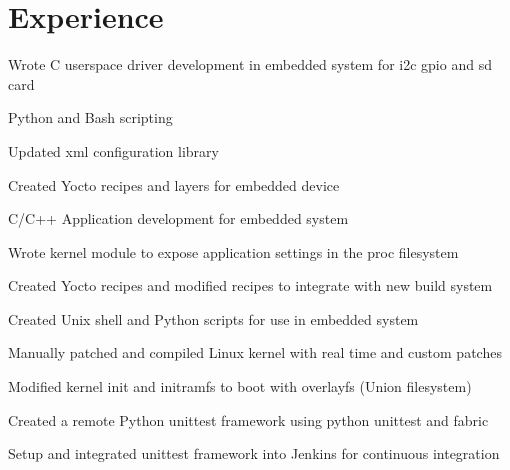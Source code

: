 \documentclass[]{deedy-resume-openfont}
\begin{document}
\begin{minipage}[t]{0.66\textwidth} 


\section{Experience}

\begin{tightemize}
\bigskip
\item Wrote C userspace driver development in embedded system for i2c gpio and sd card
\item Python and Bash scripting
\item Updated xml configuration library
\item Created Yocto recipes and layers for embedded device
\end{tightemize}
\sectionsep

\begin{tightemize}
\item C/C++ Application development for embedded system
\item Wrote kernel module to expose application settings in the proc filesystem
\item Created Yocto recipes and modified recipes to integrate with new build system
\end{tightemize}
\sectionsep

\begin{tightemize}
\item Created Unix shell and Python scripts for use in embedded system
\item Manually patched and compiled Linux kernel with real time and custom patches
\item Modified kernel init and initramfs to boot with overlayfs (Union filesystem)
\end{tightemize}
\sectionsep

\begin{tightemize}
\item Created a remote Python unittest framework using python unittest and fabric
\item Setup and integrated unittest framework into Jenkins for continuous integration
\end{tightemize}
\sectionsep


\end{minipage}
\end{document}
